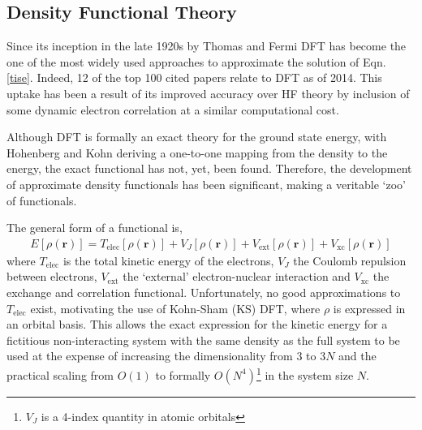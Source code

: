 \documentclass[main.tex]{subfiles}
\begin{document}
\subsection{Density Functional Theory}

Since its inception in the late 1920s by Thomas\cite{Thomas1927} and Fermi\cite{Fermi1928} DFT has become the one of the most widely used approaches to approximate the solution of Eqn. \eqref{tise}.\cite{Haunschild2019} Indeed, 12 of the top 100 cited papers relate to DFT as of 2014.\cite{VanNoorden2014} This uptake has been a result of its improved accuracy over HF theory by inclusion of some dynamic electron correlation at a similar computational cost.

Although DFT is formally an exact theory for the ground state energy, with Hohenberg and Kohn deriving a one-to-one mapping from the density to the energy,\cite{HohenbergKohn1964} the exact functional has not, yet, been found.\cite{Kanungo2019} Therefore, the development of approximate density functionals has been significant, making a veritable `zoo' of functionals.\cite{Mardirossian2017, Goerigk2017}

The general form of a functional is,
\begin{eqnarray}
E[\rho(\boldsymbol{r})] = T_\text{elec}[\rho(\boldsymbol{r})]  + V_{J}[\rho(\boldsymbol{r})] + V_\text{ext}[\rho(\boldsymbol{r})] + V_\text{xc}[\rho(\boldsymbol{r})] 
\end{eqnarray}
where $T_\text{elec}$ is the total kinetic energy of the electrons, $V_{J}$ the Coulomb repulsion between electrons, $V_\text{ext}$ the `external' electron-nuclear interaction and $V_\text{xc}$ the exchange and correlation functional. Unfortunately, no good approximations to $T_\text{elec}$ exist,\cite{OFDFT2009} motivating the use of Kohn-Sham (KS) DFT, where $\rho$ is expressed in an orbital basis.\cite{KS1965} This allows the exact expression for the kinetic energy for a fictitious non-interacting system with the same density as the full system to be used at the expense of increasing the dimensionality from 3 to 3$N$ and the practical scaling from $O(1)$ to formally $O(N^4)$\footnote{$V_J$ is a 4-index quantity in atomic orbitals} in the system size $N$.\cite{Lignres2005}
\end{document}
